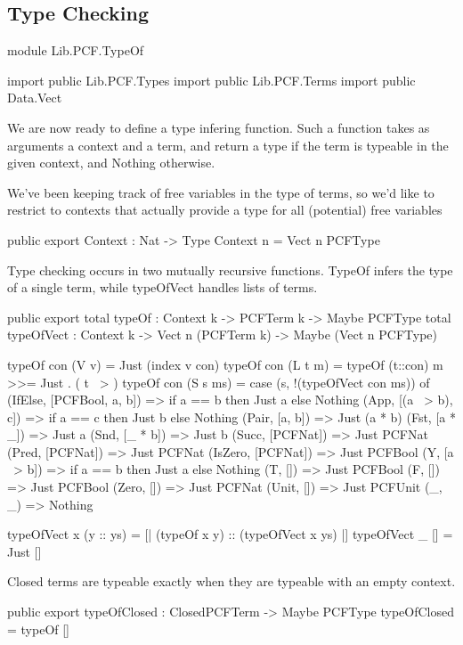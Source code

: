 \subsection{Type Checking}

\begin{hidden}
module Lib.PCF.TypeOf

import public Lib.PCF.Types
import public Lib.PCF.Terms
import public Data.Vect
\end{hidden}

We are now ready to define a type infering function. Such a function takes as
arguments a context and a term, and return a type if the term is typeable in
the given context, and Nothing otherwise.

We've been keeping track of free variables in the type of terms,
so we'd like to restrict to contexts that actually provide a type for all (potential) free variables

\begin{code}
public export
Context : Nat -> Type
Context n = Vect n PCFType
\end{code}

Type checking occurs in two mutually recursive functions. TypeOf infers the type of a single term,
while typeOfVect handles lists of terms.

\begin{code}
public export
total typeOf : Context k -> PCFTerm k -> Maybe PCFType
total typeOfVect : Context k -> Vect n (PCFTerm k) -> Maybe (Vect n PCFType)
\end{code}

\begin{code}
typeOf con (V v)      = Just (index v con)
typeOf con (L t m)    = typeOf (t::con) m >>= Just . ( t ~> )
typeOf con (S s ms)   = case (s,  !(typeOfVect con ms)) of
  (IfElse,  [PCFBool, a, b])  => if a == b
                                   then Just a
                                 else Nothing
  (App,     [(a ~> b), c])    => if a == c
                                   then Just b
                                 else Nothing
  (Pair,    [a, b])           => Just (a * b)
  (Fst,     [a * _])          => Just a
  (Snd,     [_ * b])          => Just b
  (Succ,    [PCFNat])         => Just PCFNat
  (Pred,    [PCFNat])         => Just PCFNat
  (IsZero,  [PCFNat])         => Just PCFBool
  (Y,       [a ~> b])         => if a == b
                                   then Just a
                                 else Nothing
  (T,       [])               => Just PCFBool
  (F,       [])               => Just PCFBool
  (Zero,    [])               => Just PCFNat
  (Unit,    [])               => Just PCFUnit
  (_, _)                      => Nothing

typeOfVect x (y :: ys) = [| (typeOf x y) :: (typeOfVect x ys) |]
typeOfVect _ []        = Just []
\end{code}

Closed terms are typeable exactly when they are typeable with an empty context.

\begin{code}
public export
typeOfClosed : ClosedPCFTerm -> Maybe PCFType
typeOfClosed = typeOf []
\end{code}
